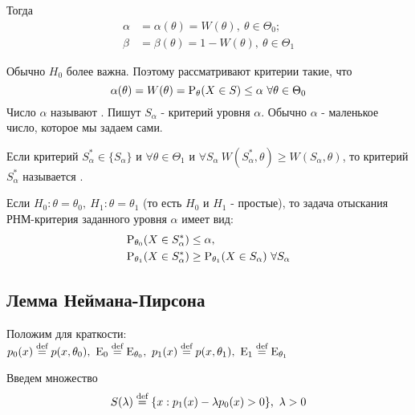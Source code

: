 Тогда
\begin{align*}
    \alpha &= \alpha(\theta) = W(\theta),\ \theta\in\Theta_0; \\
    \beta  &= \beta(\theta) = 1 - W(\theta),\ \theta\in\Theta_1
\end{align*}

\begin{definition}
Обычно \(H_0\) более важна. Поэтому рассматривают критерии
такие, что
\[\alpha(\theta) = W(\theta) = \P_{\theta}(X\in S) \leq\alpha \ \forall \theta\in\Theta_0\]
    Число \(\alpha\) называют .
    Пишут \(S_\alpha\) - критерий уровня \(\alpha\). Обычно \(\alpha\) -
    маленькое число, которое мы задаем сами.
\end{definition}

\begin{definition}
    Если критерий \(S^*_\alpha \in \{S_\alpha\}\) и \(\forall\theta\in\Theta_1\) и
    \(\forall S_\alpha \ W(S^*_\alpha,\theta) \geq W(S_\alpha, \theta)\),
    то критерий \(S^*_\alpha\) называется .
\end{definition}

Если \(H_0:\theta = \theta_0,\ H_1:\theta = \theta_1\) (то есть
\(H_0\) и \(H_1\) - простые), то задача отыскания РНМ-критерия
заданного уровня \(\alpha\) имеет вид:
\begin{align*}
  \P_{\theta_0}(X\in S^*_\alpha) &\leq \alpha, \\
  \P_{\theta_1}(X\in S^*_\alpha) &\geq \P_{\theta_1}(X\in S_\alpha) \ \forall S_\alpha
\end{align*}

\subsection{Лемма Неймана-Пирсона}

Положим для краткости:
\(p_0(x)\defeq p(x, \theta_0),\ \E_0\defeq\E_{\theta_0},\ p_{1}(x)\defeq p(x, \theta_1),\ \E_1\defeq\E_{\theta_1}\)

Введем множество
\[S(\lambda)\defeq\{x: p_1(x) - \lambda p_0(x) > 0\},\ \lambda > 0\]

